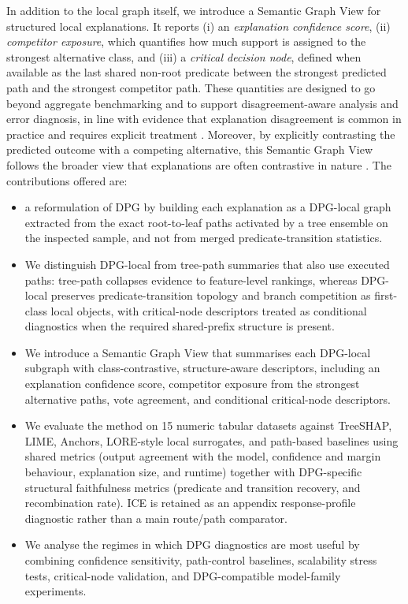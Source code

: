 \documentclass[runningheads]{llncs}
\begin{document}
In addition to the local graph itself, we introduce a Semantic Graph View for structured local explanations. It reports (i) an \emph{explanation confidence score}, (ii) \emph{competitor exposure}, which quantifies how much support is assigned to the strongest alternative class, and (iii) a \emph{critical decision node}, defined when available as the last shared non-root predicate between the strongest predicted path and the strongest competitor path. 
These quantities are designed to go beyond aggregate benchmarking and to support disagreement-aware analysis and error diagnosis, in line with evidence that explanation disagreement is common in practice and requires explicit treatment \cite{krishna2022disagreement}. 
Moreover, by explicitly contrasting the predicted outcome with a competing alternative, this Semantic Graph View follows the broader view that explanations are often contrastive in nature \cite{miller2019explanation}. 
The contributions offered are:
\begin{itemize}
  \item a reformulation of DPG by building each explanation as a DPG-local graph extracted from the exact root-to-leaf paths activated by a tree ensemble on the inspected sample, and not from merged predicate-transition statistics.
  \item We distinguish DPG-local from tree-path summaries that also use executed paths: tree-path collapses evidence to feature-level rankings, whereas DPG-local preserves predicate-transition topology and branch competition as first-class local objects, with critical-node descriptors treated as conditional diagnostics when the required shared-prefix structure is present.
  \item We introduce a Semantic Graph View that summarises each DPG-local subgraph with class-contrastive, structure-aware descriptors, including an explanation confidence score, competitor exposure from the strongest alternative paths, vote agreement, and conditional critical-node descriptors.
  \item We evaluate the method on 15 numeric tabular datasets against TreeSHAP, LIME, Anchors, LORE-style local surrogates, and path-based baselines using shared metrics (output agreement with the model, confidence and margin behaviour, explanation size, and runtime) together with DPG-specific structural faithfulness metrics (predicate and transition recovery, and recombination rate). ICE is retained as an appendix response-profile diagnostic rather than a main route/path comparator.
  \item We analyse the regimes in which DPG diagnostics are most useful by combining confidence sensitivity, path-control baselines, scalability stress tests, critical-node validation, and DPG-compatible model-family experiments.
\end{itemize}
\end{document}
